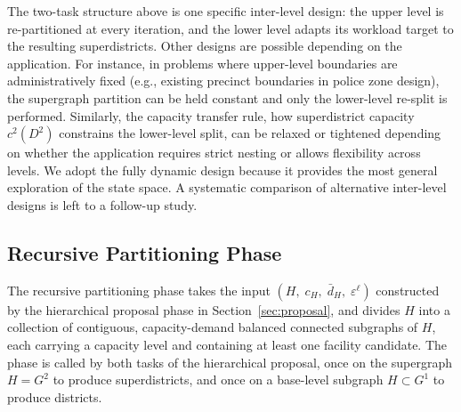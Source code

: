 \documentclass[11pt]{article}
\theoremstyle{definition}
\begin{document}
The two-task structure above is one specific inter-level design: the upper
level is re-partitioned at every iteration, and the lower level adapts its
workload target to the resulting superdistricts.  Other designs are possible
depending on the application.  For instance, in problems where upper-level
boundaries are administratively fixed (e.g., existing precinct boundaries in
police zone design), the supergraph partition can be held constant and only the
lower-level re-split is performed.  Similarly, the capacity transfer rule,
how superdistrict capacity $c^2(D^2)$ constrains the lower-level split,
can be relaxed or tightened depending on whether the application requires
strict nesting or allows flexibility across levels.  We adopt the fully dynamic design because it provides the most general exploration of the state space. A systematic comparison of alternative inter-level designs is left to a follow-up study.

\subsection{Recursive Partitioning Phase}
\label{sec:recursive}

The recursive partitioning phase takes the input $(H,\; c_H,\; \bar{d}_H,\; \varepsilon^{\ell})$ constructed by the hierarchical proposal phase in Section~\ref{sec:proposal}, and divides $H$ into a collection of contiguous, capacity-demand balanced connected subgraphs of $H$, each carrying a capacity level and containing at least one facility candidate. The phase is called by both tasks of the hierarchical proposal, once on the supergraph $H=G^2$ to produce superdistricts, and once on a base-level subgraph $H \subset G^1$ to produce districts.
\end{document}
